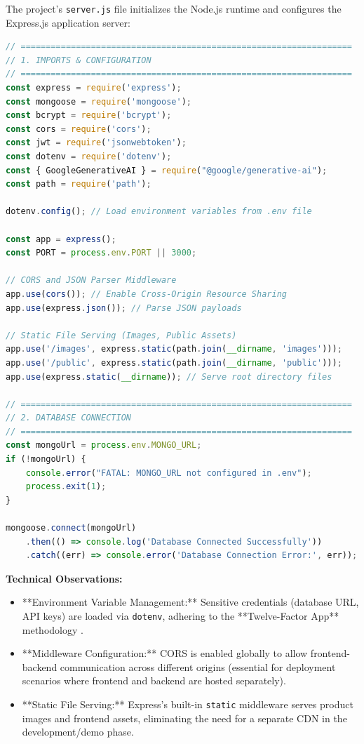 The project's \texttt{server.js} file initializes the Node.js runtime and configures the Express.js application server:

\begin{lstlisting}[language=JavaScript, caption=Node.js Server Initialization (server.js)]
// ==================================================================
// 1. IMPORTS & CONFIGURATION
// ==================================================================
const express = require('express');
const mongoose = require('mongoose');
const bcrypt = require('bcrypt');
const cors = require('cors');
const jwt = require('jsonwebtoken');
const dotenv = require('dotenv');
const { GoogleGenerativeAI } = require("@google/generative-ai");
const path = require('path');

dotenv.config(); // Load environment variables from .env file

const app = express();
const PORT = process.env.PORT || 3000;

// CORS and JSON Parser Middleware
app.use(cors()); // Enable Cross-Origin Resource Sharing
app.use(express.json()); // Parse JSON payloads

// Static File Serving (Images, Public Assets)
app.use('/images', express.static(path.join(__dirname, 'images')));
app.use('/public', express.static(path.join(__dirname, 'public')));
app.use(express.static(__dirname)); // Serve root directory files

// ==================================================================
// 2. DATABASE CONNECTION
// ==================================================================
const mongoUrl = process.env.MONGO_URL;
if (!mongoUrl) {
    console.error("FATAL: MONGO_URL not configured in .env");
    process.exit(1);
}

mongoose.connect(mongoUrl)
    .then(() => console.log('Database Connected Successfully'))
    .catch((err) => console.error('Database Connection Error:', err));
\end{lstlisting}

\textbf{Technical Observations:}
\begin{itemize}
    \item **Environment Variable Management:** Sensitive credentials (database URL, API keys) are loaded via \texttt{dotenv}, adhering to the **Twelve-Factor App** methodology \cite{twelvefactor}.
    \item **Middleware Configuration:** CORS is enabled globally to allow frontend-backend communication across different origins (essential for deployment scenarios where frontend and backend are hosted separately).
    \item **Static File Serving:** Express's built-in \texttt{static} middleware serves product images and frontend assets, eliminating the need for a separate CDN in the development/demo phase.
\end{itemize}

